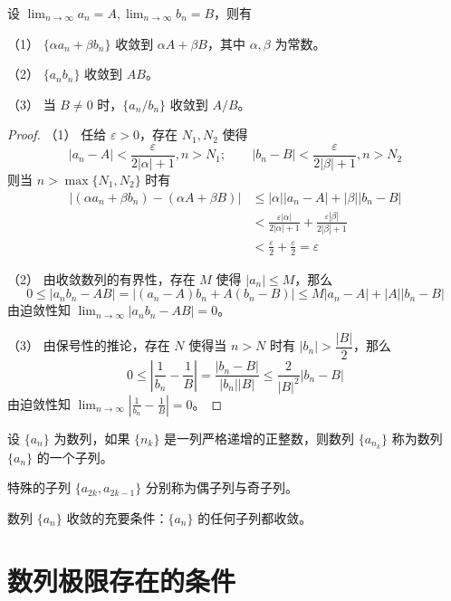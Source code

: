 \begin{theorem}[四则运算]
	设 $\displaystyle\lim_{n\to \infty} a_n = A,\displaystyle\lim_{n\to \infty} b_n = B$，则有

	（1） $\{\alpha a_n+\beta b_n\}$ 收敛到 $\alpha A+\beta B$，其中 $\alpha,\beta$ 为常数。

	（2） $\{a_nb_n\}$ 收敛到 $AB$。

	（3） 当 $B\ne 0$ 时，$\{a_n/b_n\}$ 收敛到 $A/B$。
\end{theorem}
\begin{proof}
	（1） 任给 $\varepsilon >0$，存在 $N_1,N_2$ 使得
	$$|a_n-A|<\frac{\varepsilon}{2|\alpha|+1},n>N_1;\qquad |b_n-B|<\frac{\varepsilon}{2|\beta|+1},n>N_2$$
	则当 $n>\max\{N_1,N_2\}$ 时有
	\begin{equation*}
		\begin{aligned}
			|(\alpha a_n+\beta b_n)-(\alpha A+\beta B)|&\leqslant |\alpha||a_n-A|+|\beta||b_n-B|\\
			&< \frac{\varepsilon|\alpha|}{2|\alpha|+1}+\frac{\varepsilon|\beta|}{2|\beta|+1}\\
			&< \frac{\varepsilon}2+\frac{\varepsilon}2=\varepsilon
		\end{aligned}
	\end{equation*}

	（2） 由收敛数列的有界性，存在 $M$ 使得 $|a_n|\leqslant M$，那么
	$$0\leqslant |a_nb_n-AB|=|(a_n-A)b_n+A(b_n-B)|\leqslant M|a_n-A|+|A||b_n-B|$$
	由迫敛性知 $\displaystyle\lim_{n\to \infty}|a_nb_n-AB| =0$。

	（3） 由保号性的推论，存在 $N$ 使得当 $n>N$ 时有 $|b_n|>\dfrac{|B|}{2}$，那么
	$$0 \leqslant \left|\frac{1}{b_n}-\frac{1}{B}\right| = \frac{|b_n-B|}{|b_n||B|} \leqslant \frac{2}{|B|^2}{|b_n-B|}$$
	由迫敛性知 $\displaystyle\lim_{n\to \infty}\left|\frac{1}{b_n}-\frac{1}{B}\right| =0$。
\end{proof}

\begin{definition}[数列的子列]
	设 $\{a_n\}$ 为数列，如果 $\{n_k\}$ 是一列严格递增的正整数，则数列 $\{a_{n_k}\}$ 称为数列 $\{a_n\}$ 的一个子列。
\end{definition}

特殊的子列 $\{a_{2k},a_{2k-1}\}$ 分别称为偶子列与奇子列。

\begin{theorem}
	数列 $\{a_n\}$ 收敛的充要条件：$\{a_n\}$ 的任何子列都收敛。
\end{theorem}

\section{数列极限存在的条件}


